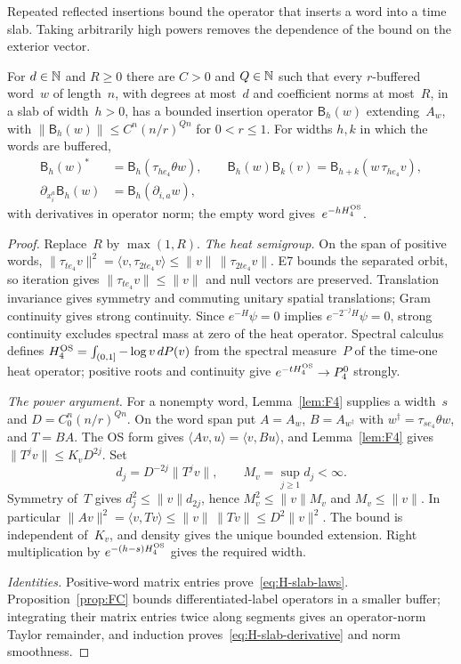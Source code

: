 Repeated reflected insertions bound the operator that inserts a word into a time slab. Taking arbitrarily high powers removes the dependence of the bound on the exterior vector.
\begin{lemma}\label{lem:H1.1}
For $d\in\mathbb{N}$ and $R\ge0$ there are $C>0$ and $Q\in\mathbb{N}$ such that every $r$-buffered word~$w$ of length~$n$, with degrees at most~$d$ and coefficient norms at most~$R$, in a slab of width~$h>0$, has a bounded insertion operator $\mathsf B_h(w)$ extending~$A_w$, with $\|\mathsf B_h(w)\|\le C^n(n/r)^{Qn}$ for $0<r\le1$. For widths $h,k$ in which the words are buffered,
\begin{align}
\mathsf B_h(w)^*&=\mathsf B_h(\tau_{he_4}\theta w),\qquad
\mathsf B_h(w)\mathsf B_k(v)=\mathsf B_{h+k}(w\,\tau_{he_4}v),\label{eq:H-slab-laws}\\
\partial_{x_i^a}\mathsf B_h(w)&=\mathsf B_h(\partial_{i,a}w),\label{eq:H-slab-derivative}
\end{align}
with derivatives in operator norm; the empty word gives~$e^{-hH_4^{\rm OS}}$.
\end{lemma}
\begin{proof}
Replace~$R$ by $\max(1,R)$. \emph{The heat semigroup.} On the span of positive words, $\|\tau_{te_4}v\|^2=\langle v,\tau_{2te_4}v\rangle\le\|v\|\,\|\tau_{2te_4}v\|$. E7 bounds the separated orbit, so iteration gives $\|\tau_{te_4}v\|\le\|v\|$ and null vectors are preserved. Translation invariance gives symmetry and commuting unitary spatial translations; Gram continuity gives strong continuity. Since $e^{-H}\psi=0$ implies $e^{-2^{-j}H}\psi=0$, strong continuity excludes spectral mass at zero of the heat operator. Spectral calculus~\cite[Theorem~2.5.1 and Proposition~4.2.3]{Landsman1998} defines $H_4^{\rm OS}=\int_{(0,1]}-\log v\,dP(v)$ from the spectral measure~$P$ of the time-one heat operator; positive roots and continuity give $e^{-tH_4^{\rm OS}}\to P_4^0$ strongly.

\emph{The power argument.} For a nonempty word, Lemma~\ref{lem:F4} supplies a width~$s$ and $D=C_0^n(n/r)^{Qn}$. On the word span put $A=A_w$, $B=A_{w^\dagger}$ with $w^\dagger=\tau_{se_4}\theta w$, and $T=BA$. The OS form gives $\langle Av,u\rangle=\langle v,Bu\rangle$, and Lemma~\ref{lem:F4} gives $\|T^jv\|\le K_vD^{2j}$. Set
\begin{equation*}
d_j=D^{-2j}\|T^jv\|,\qquad M_v=\sup_{j\ge1}d_j<\infty.
\end{equation*}
Symmetry of~$T$ gives $d_j^2\le\|v\|d_{2j}$, hence $M_v^2\le\|v\|M_v$ and $M_v\le\|v\|$. In particular $\|Av\|^2=\langle v,Tv\rangle\le\|v\|\,\|Tv\|\le D^2\|v\|^2$. The bound is independent of~$K_v$, and density gives the unique bounded extension. Right multiplication by $e^{-(h-s)H_4^{\rm OS}}$ gives the required width.

\emph{Identities.} Positive-word matrix entries prove~\eqref{eq:H-slab-laws}. Proposition~\ref{prop:FC} bounds differentiated-label operators in a smaller buffer; integrating their matrix entries twice along segments gives an operator-norm Taylor remainder, and induction proves~\eqref{eq:H-slab-derivative} and norm smoothness.
\end{proof}

